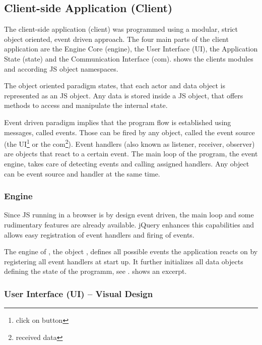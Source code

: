 \subsection{Client-side Application (Client)}
\label{sec:client}

The client-side application (client) was programmed using a modular, strict object oriented, event driven approach.
The four main parts of the client application are the Engine Core (engine), the User Interface (UI), the Application State (state) and the Communication Interface (com).
 shows the clients modules and according JS object namespaces.


The object oriented paradigm states, that each actor and data object is represented as an JS object.
Any data is stored inside a JS object, that offers methods to access and manipulate the internal state.

Event driven paradigm implies that the program flow is established using messages, called events.
Those can be fired by any object, called the event source (the UI\footnote{click on button} or the com\footnote{received data}).
Event handlers (also known as listener, receiver, observer) are objects that react to a certain event.
The main loop of the program, the event engine, takes care of detecting events and calling assigned handlers.
Any object can be event source and handler at the same time.


\subsubsection{Engine}
\label{sec:engine}

Since JS running in a browser is by design event driven, the main loop and some rudimentary features are already available.
jQuery enhances this capabilities and allows easy registration of event handlers and firing of events.

The engine of \spl, the object , defines all possible events the application reacts on by registering all event handlers at start up.
It further initializes all data objects defining the state of the programm, see .
 shows an excerpt.



\subsubsection{User Interface (UI) -- Visual Design}
\label{sec:ui-vis}


